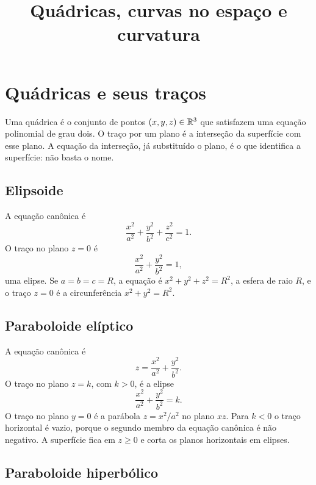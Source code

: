 \documentclass[11pt,a4paper]{article}
\title{Quádricas, curvas no espaço e curvatura}
\author{}
\date{}
\begin{document}
\maketitle
\tableofcontents


\section{Quádricas e seus traços}

Uma quádrica é o conjunto de pontos \((x,y,z)\in\mathbb{R}^3\) que satisfazem uma equação polinomial de grau dois. O traço por um plano é a interseção da superfície com esse plano. A equação da interseção, já substituído o plano, é o que identifica a superfície: não basta o nome.

\subsection{Elipsoide}

A equação canônica é
\[
\frac{x^{2}}{a^{2}}+\frac{y^{2}}{b^{2}}+\frac{z^{2}}{c^{2}}=1.
\]
O traço no plano \(z=0\) é
\[
\frac{x^{2}}{a^{2}}+\frac{y^{2}}{b^{2}}=1,
\]
uma elipse. Se \(a=b=c=R\), a equação é \(x^{2}+y^{2}+z^{2}=R^{2}\), a esfera de raio \(R\), e o traço \(z=0\) é a circunferência \(x^{2}+y^{2}=R^{2}\).

\subsection{Paraboloide elíptico}

A equação canônica é
\[
z=\frac{x^{2}}{a^{2}}+\frac{y^{2}}{b^{2}}.
\]
O traço no plano \(z=k\), com \(k>0\), é a elipse
\[
\frac{x^{2}}{a^{2}}+\frac{y^{2}}{b^{2}}=k.
\]
O traço no plano \(y=0\) é a parábola \(z=x^{2}/a^{2}\) no plano \(xz\). Para \(k<0\) o traço horizontal é vazio, porque o segundo membro da equação canônica é não negativo. A superfície fica em \(z\ge 0\) e corta os planos horizontais em elipses.

\subsection{Paraboloide hiperbólico}
\end{document}

